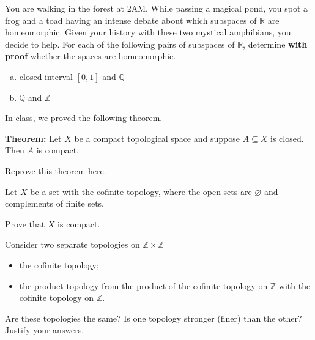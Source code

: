 \documentclass[11pt]{exam}
\theoremstyle{definition}
\begin{document}
\begin{questions}
\newpage
\question[10]\mbox{}
You are walking in the forest at 2AM.  While passing a magical pond, you spot a frog and a toad having an intense debate about which subspaces of $\mathbb R$ are homeomorphic.
Given your history with these two mystical amphibians, you decide to help.
For each of the following pairs of subspaces of $\mathbb R$, determine \textbf{with proof} whether the spaces are homeomorphic.

\begin{enumerate}[(a)]
\item closed interval $[0,1]$ and $\mathbb Q$
\vspace{3.8in}
\item $\mathbb Q$ and $\mathbb Z$
\end{enumerate}

\newpage
\question[10]

In class, we proved the following theorem.

\textbf{Theorem:}  Let $X$ be a compact topological space and suppose $A\subseteq X$ is closed.  Then $A$ is compact.

Reprove this theorem here.

\newpage
\question[10]

Let $X$ be a set with the cofinite topology, where the open sets are $\varnothing$ and complements of finite sets.

Prove that $X$ is compact.

\newpage
\question[10]

Consider two separate topologies on $\mathbb{Z}\times \mathbb{Z}$
\begin{itemize}
\item the cofinite topology;
\item the product topology from the product of the cofinite topology on $\mathbb{Z}$ with the cofinite topology on $\mathbb{Z}$.
\end{itemize}

Are these topologies the same?  Is one topology stronger (finer) than the other?  Justify your answers.


\end{questions}
\end{document}
